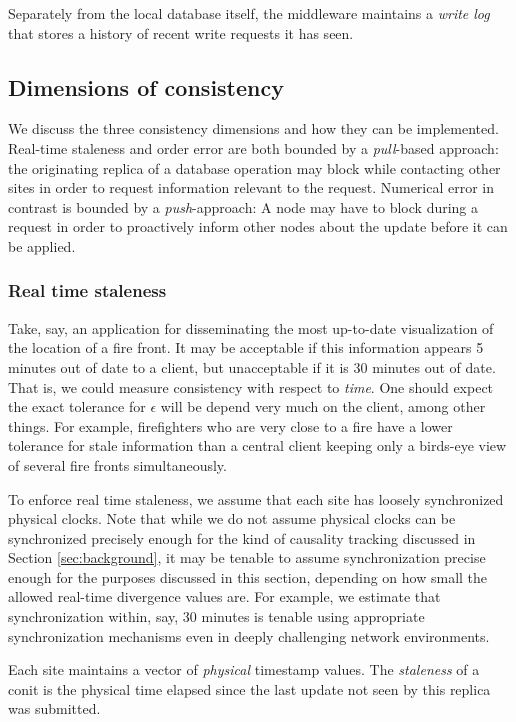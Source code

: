 \documentclass[]             %
{NASA}                       %
\theoremstyle{definition}
\begin{document}
Separately from the local database itself, the middleware maintains a
\emph{write log} that stores a history of recent write requests it has
seen.

\subsection{Dimensions of consistency}
\label{measuring-consistency-on-conits}

We discuss the three consistency dimensions and how they can be
implemented. Real-time staleness and order error are both bounded by a
\emph{pull}-based approach: the originating replica of a database
operation may block while contacting other sites in order to request
information relevant to the request. Numerical error in contrast is
bounded by a \emph{push}-approach: A node may have to block during a
request in order to proactively inform other nodes about the update
before it can be applied.

\subsubsection{Real time staleness}
\label{sssec:real-time-consistency}
Take, say, an application for disseminating the most up-to-date
visualization of the location of a fire front. It may be acceptable if
this information appears 5 minutes out of date to a client, but
unacceptable if it is 30 minutes out of date. That is, we could
measure consistency with respect to \emph{time}. One should expect the
exact tolerance for \(\epsilon\) will be depend very much on the
client, among other things. For example, firefighters who are very
close to a fire have a lower tolerance for stale information than a
central client keeping only a birds-eye view of several fire fronts
simultaneously.

To enforce real time staleness, we assume that each site has loosely
synchronized physical clocks. Note that while we do not assume
physical clocks can be synchronized precisely enough for the kind of
causality tracking discussed in Section \ref{sec:background}, it may
be tenable to assume synchronization precise enough for the purposes
discussed in this section, depending on how small the allowed
real-time divergence values are. For example, we estimate that
synchronization within, say, 30 minutes is tenable using appropriate
synchronization mechanisms even in deeply challenging network
environments.

Each site maintains a vector of \emph{physical} timestamp values. The
\emph{staleness} of a conit is the physical time elapsed since the
last update not seen by this replica was submitted.
\end{document}
